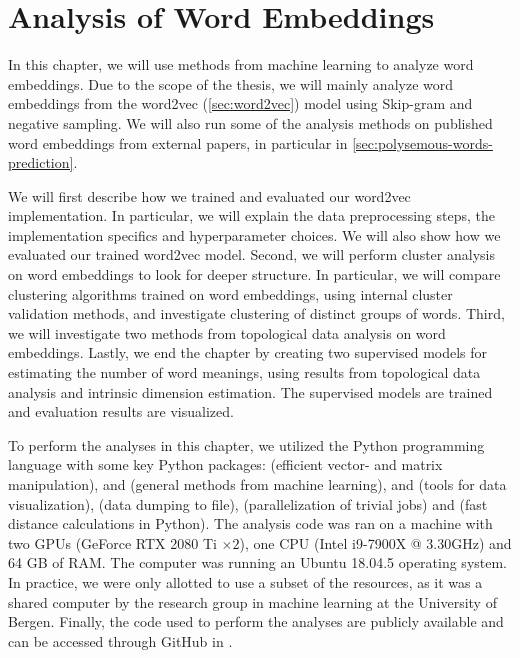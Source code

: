 \chapter{Analysis of Word Embeddings}
\label{chap:analysis-of-word-embeddings}
In this chapter, we will use methods from machine learning to analyze word embeddings. Due to the scope of the thesis, we will mainly analyze word embeddings from the word2vec (\cref{sec:word2vec}) model using Skip-gram and negative sampling. We will also run some of the analysis methods on published word embeddings from external papers, in particular in \cref{sec:polysemous-words-prediction}.

We will first describe how we trained and evaluated our word2vec implementation. In particular, we will explain the data preprocessing steps, the implementation specifics and hyperparameter choices. We will also show how we evaluated our trained word2vec model. Second, we will perform cluster analysis on word embeddings to look for deeper structure. In particular, we will compare clustering algorithms trained on word embeddings, using internal cluster validation methods, and investigate clustering of distinct groups of words. Third, we will investigate two methods from topological data analysis on word embeddings. Lastly, we end the chapter by creating two supervised models for estimating the number of word meanings, using results from topological data analysis and intrinsic dimension estimation. The supervised models are trained and evaluation results are visualized.

To perform the analyses in this chapter, we utilized the Python programming language with some key Python packages:  \cite{2020NumPy-Array} (efficient vector- and matrix manipulation),  \cite{ScikitLearn2011} and  \cite{2020SciPy-NMeth} (general methods from machine learning),  \cite{Matplotlib2007} and  \cite{seaborn2021} (tools for data visualization),  \cite{joblib2021} (data dumping to file),  \cite{sharedmem2020} (parallelization of trivial jobs) and  \cite{fastdist2021} (fast distance calculations in Python). The analysis code was ran on a machine with two GPUs (GeForce RTX 2080 Ti $\times2$), one CPU (Intel i9-7900X @ 3.30GHz) and 64 GB of RAM. The computer was running an Ubuntu 18.04.5 operating system. In practice, we were only allotted to use a subset of the resources, as it was a shared computer by the research group in machine learning at the University of Bergen. Finally, the code used to perform the analyses are publicly available and can be accessed through GitHub in \cite{Triki2021}.



